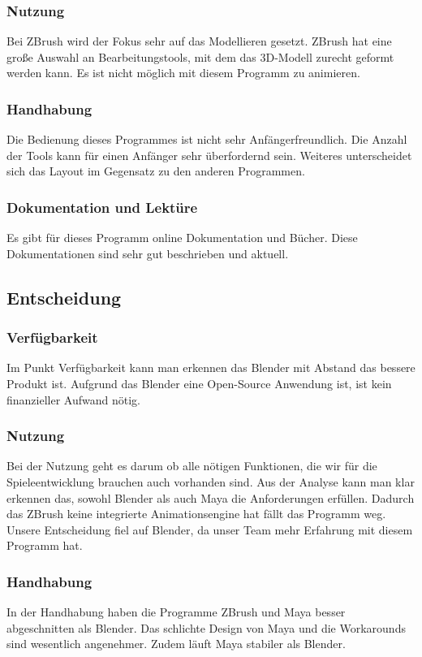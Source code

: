 \subsubsection{Nutzung}
Bei ZBrush wird der Fokus sehr auf das Modellieren gesetzt. ZBrush hat eine große Auswahl an Bearbeitungstools, mit dem das 3D-Modell zurecht geformt werden kann. Es ist nicht möglich mit diesem Programm zu animieren.

\subsubsection{Handhabung}
Die Bedienung dieses Programmes ist nicht sehr Anfängerfreundlich. Die Anzahl der Tools kann für einen Anfänger sehr überfordernd sein. Weiteres unterscheidet sich das Layout im Gegensatz zu den anderen Programmen.

\subsubsection{Dokumentation und Lektüre}
Es gibt für dieses Programm online Dokumentation und Bücher. Diese Dokumentationen sind sehr gut beschrieben und aktuell.

\pagebreak

\subsection{Entscheidung}
\subsubsection{Verfügbarkeit}
Im Punkt Verfügbarkeit kann man erkennen das Blender mit Abstand das bessere Produkt ist. Aufgrund das Blender eine Open-Source Anwendung ist, ist kein finanzieller Aufwand nötig.

\subsubsection{Nutzung}
Bei der Nutzung geht es darum ob alle nötigen Funktionen, die wir für die Spieleentwicklung brauchen auch vorhanden sind. Aus der Analyse kann man klar erkennen das, sowohl Blender als auch Maya die Anforderungen erfüllen. Dadurch das ZBrush keine integrierte Animationsengine hat fällt das Programm weg. Unsere Entscheidung fiel auf Blender, da unser Team mehr Erfahrung mit diesem Programm hat. 

\subsubsection{Handhabung}
In der Handhabung haben die Programme ZBrush und Maya besser abgeschnitten als Blender. Das schlichte Design von Maya und die Workarounds  sind wesentlich angenehmer. Zudem läuft Maya stabiler als Blender.

